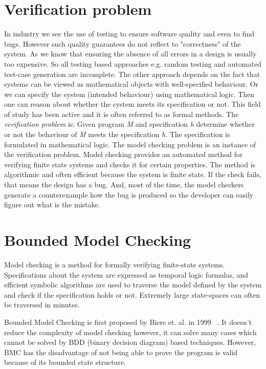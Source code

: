 \documentclass[14pt]{article}
\begin{document}
\section{Verification problem}\label{verification problem}
In industry we see the use of testing to ensure software quality and even to find bugs. However such quality guarantees do not reflect to "correctness" of  the system. As we know that ensuring the absence of all errors in a design is usually too expensive. So all testing based approaches e.g. random testing and automated test-case generation are incomplete.  The other approach depends on the fact that systems can be viewed as mathematical objects with well-specified behaviour. Or we can specify the system (intended behaviour) using mathematical logic. Then one can reason about whether the system meets its specification or not. This field of study has been active and it is often referred to as formal methods. The \textit{verification problem} is: Given program \textit{M} and specification \textit{h} determine whether or not the behaviour of \textit{M} meets the specification \textit{h}. The specification is formulated in mathematical logic. The model checking problem is an instance of the verification problem. Model checking provides an automated method for verifying finite state systems and checks it for certain properties. The method is algorithmic and often efficient because the system is finite state. If the check fails, that means the design has a bug. And, most of the time, the model checkers generate a counterexample how the bug is produced so the developer can easily figure out what is the mistake.

\section{Bounded Model Checking}\label{bounded model checking}

Model checking is a method for formally verifying finite-state systems. Specifications about the system are expressed as temporal logic formulas, and efficient symbolic algorithms are used to traverse the model defined by the system and check if the specification holds or not. Extremely large state-spaces can often be traversed in minutes.
					
Bounded Model Checking is first proposed by Biere et. al. in 1999 ~\cite{1}. It doesn't reduce the complexity of model checking however, it can solve many cases which cannot be solved by BDD (binary decision diagram) based techniques. However, BMC has the disadvantage of not being able to prove the program is valid because of its bounded state structure.
					
\end{document}

